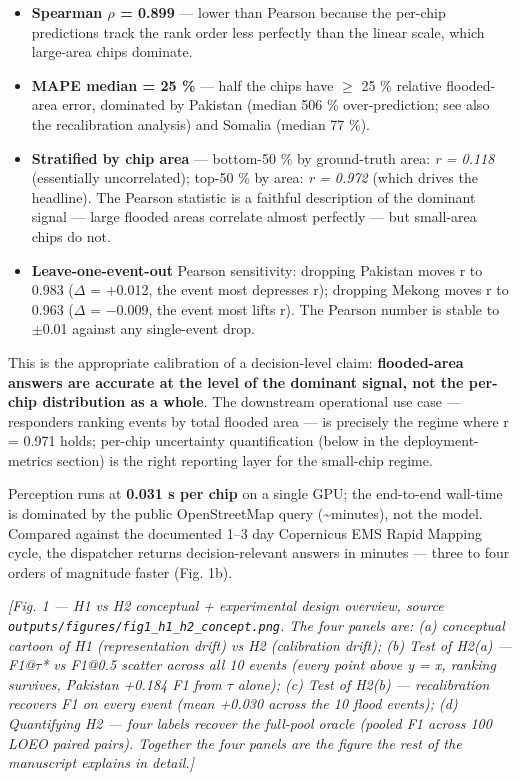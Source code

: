 \begin{itemize}
\tightlist
\item
  \textbf{Spearman $\rho$ = 0.899} --- lower than Pearson because the per-chip
  predictions track the rank order less perfectly than the linear scale,
  which large-area chips dominate.
\item
  \textbf{MAPE median = 25 \%} --- half the chips have $\geq$ 25 \% relative
  flooded-area error, dominated by Pakistan (median 506 \% over-prediction;
  see also the recalibration analysis) and Somalia (median 77 \%).
\item
  \textbf{Stratified by chip area} --- bottom-50 \% by ground-truth area:
  \emph{r = 0.118} (essentially uncorrelated); top-50 \% by area: \emph{r = 0.972}
  (which drives the headline). The Pearson statistic is a faithful
  description of the dominant signal --- large flooded areas correlate
  almost perfectly --- but small-area chips do not.
\item
  \textbf{Leave-one-event-out} Pearson sensitivity: dropping Pakistan moves r
  to 0.983 ($\Delta$ = +0.012, the event most depresses r); dropping Mekong
  moves r to 0.963 ($\Delta$ = $-$0.009, the event most lifts r). The Pearson
  number is stable to $\pm$0.01 against any single-event drop.
\end{itemize}

This is the appropriate calibration of a decision-level claim:
\textbf{flooded-area answers are accurate at the level of the dominant signal,
not the per-chip distribution as a whole}. The downstream operational
use case --- responders ranking events by total flooded area --- is precisely
the regime where r = 0.971 holds; per-chip uncertainty quantification
(below in the deployment-metrics section) is the right reporting layer for the small-chip regime.

Perception runs at \textbf{0.031 s per chip} on a single GPU; the end-to-end
wall-time is dominated by the public OpenStreetMap query (\textasciitilde minutes), not the
model. Compared against the documented 1--3 day Copernicus EMS Rapid Mapping
cycle, the dispatcher returns decision-relevant answers in minutes --- three to
four orders of magnitude faster (Fig. 1b).

\emph{{[}Fig. 1 --- H1 vs H2 conceptual + experimental design overview, source
\texttt{outputs/figures/fig1\_h1\_h2\_concept.png}. The four panels are:
(a) conceptual cartoon of H1 (representation drift) vs H2 (calibration
drift); (b) Test of H2(a) --- F1@$\tau$* vs F1@0.5 scatter across all 10
events (every point above y = x, ranking survives, Pakistan +0.184 F1
from $\tau$ alone); (c) Test of H2(b) --- recalibration recovers F1 on every
event (mean +0.030 across the 10 flood events); (d) Quantifying H2 ---
four labels recover the full-pool oracle (pooled F1 across 100 LOEO
paired pairs). Together the four panels are the figure the rest of the
manuscript explains in detail.{]}}

